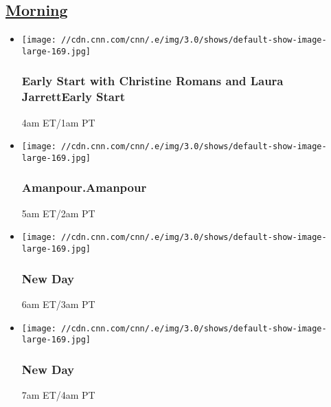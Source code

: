 \hypertarget{morning--4}{%
\subsection{\texorpdfstring{\href{/tv/schedule/cnn/index.html}{Morning}~}{Morning~}}\label{morning--4}}

\begin{itemize}
\item
  \texttt{[image: //cdn.cnn.com/cnn/.e/img/3.0/shows/default-show-image-large-169.jpg]}

  \hypertarget{early-start-with-christine-romans-and-laura-jarrettearly-start--2}{%
  \subsubsection{Early Start with Christine Romans and Laura
  JarrettEarly Start
  }\label{early-start-with-christine-romans-and-laura-jarrettearly-start--2}}

  4am ET/1am PT
\end{itemize}

\begin{itemize}
\item
  \texttt{[image: //cdn.cnn.com/cnn/.e/img/3.0/shows/default-show-image-large-169.jpg]}

  \hypertarget{amanpouramanpour--5}{%
  \subsubsection{Amanpour.Amanpour }\label{amanpouramanpour--5}}

  5am ET/2am PT
\end{itemize}

\begin{itemize}
\item
  \texttt{[image: //cdn.cnn.com/cnn/.e/img/3.0/shows/default-show-image-large-169.jpg]}

  \hypertarget{new-day-4}{%
  \subsubsection{New Day}\label{new-day-4}}

  6am ET/3am PT
\end{itemize}

\begin{itemize}
\item
  \texttt{[image: //cdn.cnn.com/cnn/.e/img/3.0/shows/default-show-image-large-169.jpg]}

  \hypertarget{new-day-5}{%
  \subsubsection{New Day}\label{new-day-5}}

  7am ET/4am PT
\end{itemize}


